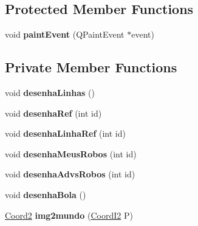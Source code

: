 \subsection*{Protected Member Functions}
\begin{DoxyCompactItemize}
\item 
void {\bfseries paint\+Event} (Q\+Paint\+Event $\ast$event)\hypertarget{classAnimacao_a8dc20d3f517bcc75f3fefb4120976dfe}{}\label{classAnimacao_a8dc20d3f517bcc75f3fefb4120976dfe}

\end{DoxyCompactItemize}
\subsection*{Private Member Functions}
\begin{DoxyCompactItemize}
\item 
void {\bfseries desenha\+Linhas} ()\hypertarget{classAnimacao_a624073dd3553b9995044d03a30c8a039}{}\label{classAnimacao_a624073dd3553b9995044d03a30c8a039}

\item 
void {\bfseries desenha\+Ref} (int id)\hypertarget{classAnimacao_ad9cad47b5132f7184f7e3bd8d6f499ea}{}\label{classAnimacao_ad9cad47b5132f7184f7e3bd8d6f499ea}

\item 
void {\bfseries desenha\+Linha\+Ref} (int id)\hypertarget{classAnimacao_a92bbe2477fe33c82713681fd6c1c3b7f}{}\label{classAnimacao_a92bbe2477fe33c82713681fd6c1c3b7f}

\item 
void {\bfseries desenha\+Meus\+Robos} (int id)\hypertarget{classAnimacao_a2398877f5d7b583bedf475d3bfd973a3}{}\label{classAnimacao_a2398877f5d7b583bedf475d3bfd973a3}

\item 
void {\bfseries desenha\+Advs\+Robos} (int id)\hypertarget{classAnimacao_ac1872de49db94dcde3eaa850a6ca3dca}{}\label{classAnimacao_ac1872de49db94dcde3eaa850a6ca3dca}

\item 
void {\bfseries desenha\+Bola} ()\hypertarget{classAnimacao_ae254c11f262b5352b738d7bea8cc396f}{}\label{classAnimacao_ae254c11f262b5352b738d7bea8cc396f}

\item 
\hyperlink{structCoord2}{Coord2} {\bfseries img2mundo} (\hyperlink{classCoordI2}{Coord\+I2} P)\hypertarget{classAnimacao_a64ee3f00e28996eec52bff8b0f9ca2c6}{}\label{classAnimacao_a64ee3f00e28996eec52bff8b0f9ca2c6}


\end{DoxyCompactItemize}
